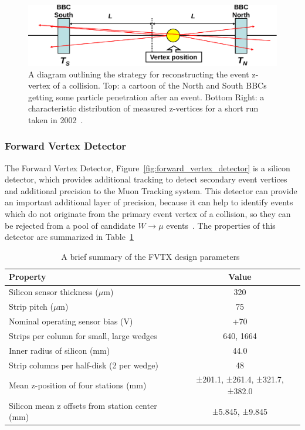 \begin{figure}[ht]
  \centering
  \includegraphics[width=\linewidth]{./figures/bbc_vertex_reconstruction}
  \caption{
    A diagram outlining the strategy for reconstructing the event z-vertex of a
    collision. Top: a cartoon of the North and South BBCs getting some particle
    penetration after an event. Bottom Right: a characteristic distribution of
    measured z-vertices for a short run taken in 2002~\cite{Nakamura2002}.
  }
  \label{fig:bbc_vertex_reconstruction}
\end{figure}


\clearpage
\subsubsection{Forward Vertex Detector}

The Forward Vertex Detector, Figure~\ref{fig:forward_vertex_detector} is a
silicon detector, which provides additional tracking to detect secondary event
vertices and additional precision to the Muon Tracking system. This detector can
provide an important additional layer of precision, because it can help to
identify events which do not originate from the primary event vertex of a
collision, so they can be rejected from a pool of candidate $W\rightarrow\mu$
events~\cite{Aidala2014}. The properties of this detector are summarized in
Table~\ref{tab:fvtx_properties}

\begin{table}[ht]
  \centering
  \begin{tabular}{lc}
    \toprule
    \textbf{Property} & \textbf{Value}\\
    \midrule
    Silicon sensor thickness ($\mu$m) &	320\\
    Strip pitch ($\mu$m) &	75\\
    Nominal operating sensor bias (V)	& +70\\
    Strips per column for small, large wedges	& 640, 1664\\
    Inner radius of silicon (mm) &	44.0\\
    Strip columns per half-disk (2 per wedge) &	48\\
    Mean z-position of four stations (mm)	& ±201.1, ±261.4, ±321.7, ±382.0\\
    Silicon mean z offsets from station center (mm) & 	±5.845, ±9.845\\
    \bottomrule
  \end{tabular}
  \caption{
    A brief summary of the FVTX design parameters~\cite{Aidala2014}
  }
  \label{tab:fvtx_properties}
\end{table}

